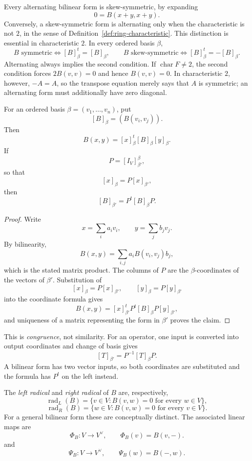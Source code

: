 Every alternating bilinear form is skew-symmetric, by expanding
\[
0=B(x+y,x+y).
\]
Conversely, a skew-symmetric form is alternating only when the
characteristic is not \(2\), in the sense of
Definition~\ref{def:ring-characteristic}. This distinction is essential in
characteristic \(2\).
In every ordered basis \(\beta\),
\[
B\text{ symmetric}\Longleftrightarrow[B]_\beta^t=[B]_\beta,
\qquad
B\text{ skew-symmetric}\Longleftrightarrow[B]_\beta^t=-[B]_\beta.
\]
Alternating always implies the second condition.  If
\(\operatorname{char}F\ne2\), the second condition forces
\(2B(v,v)=0\) and hence \(B(v,v)=0\).  In characteristic \(2\), however,
\(-A=A\), so the transpose equation merely says that \(A\) is symmetric; an
alternating form must additionally have zero diagonal.

\begin{proposition}\label{prop:bilinear-matrix}
For an ordered basis \(\beta=(v_1,\ldots,v_n)\), put
\[
[B]_\beta=(B(v_i,v_j)).
\]
Then
\[
B(x,y)=[x]_\beta^t[B]_\beta[y]_\beta.
\]
If
\[
P=[I_V]^\beta_{\beta'},
\]
so that
\[
[x]_\beta=P[x]_{\beta'},
\]
then
\[
[B]_{\beta'}=P^t[B]_\beta P.
\]
\end{proposition}
\begin{proof}
Write
\[
x=\sum_i a_iv_i,
\qquad
y=\sum_j b_jv_j.
\]
By bilinearity,
\[
B(x,y)=\sum_{i,j}a_iB(v_i,v_j)b_j,
\]
which is the stated matrix product.  The columns of \(P\) are the
\(\beta\)-coordinates of the vectors of \(\beta'\).  Substitution of
\[
[x]_\beta=P[x]_{\beta'},
\qquad
[y]_\beta=P[y]_{\beta'}
\]
into the coordinate formula gives
\[
B(x,y)
=[x]_{\beta'}^tP^t[B]_\beta P[y]_{\beta'},
\]
and uniqueness of a matrix representing the form in \(\beta'\) proves the
claim.
\end{proof}

This is \emph{congruence}, not similarity.  For an operator, one input is
converted into output coordinates and change of basis gives
\[
[T]_{\beta'}=P^{-1}[T]_\beta P.
\]
A bilinear form has two vector inputs, so both coordinates are substituted
and the formula has \(P^t\) on the left instead.

\begin{definition}
The \emph{left radical} and \emph{right radical} of \(B\) are, respectively,
\[
\operatorname{rad}_L(B)
=\{v\in V:B(v,w)=0\text{ for every }w\in V\},
\]
\[
\operatorname{rad}_R(B)
=\{w\in V:B(v,w)=0\text{ for every }v\in V\}.
\]
For a general bilinear form these are conceptually distinct.  The associated
linear maps are
\[
\Phi_B:V\longrightarrow V^\vee,
\qquad
\Phi_B(v)=B(v,-).
\]
and
\[
\Psi_B:V\longrightarrow V^\vee,
\qquad
\Psi_B(w)=B(-,w).
\]
\end{definition}

